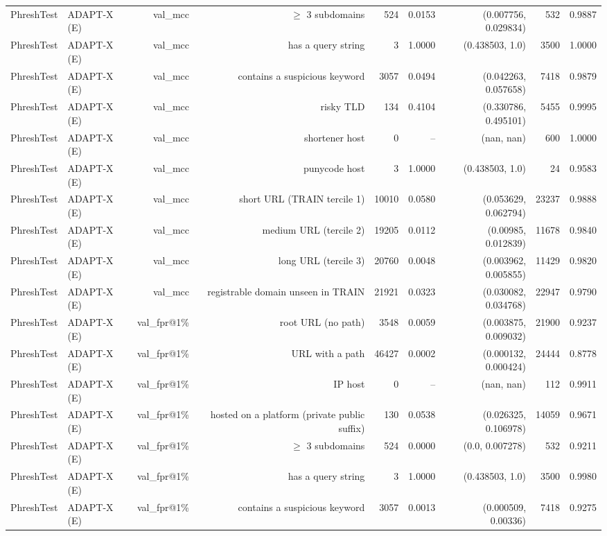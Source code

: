 \begin{table}[t]
\begin{tabular}{llrrrrrrr}
PhreshTest & ADAPT-X (E) & val\_mcc & $\geq$ 3 subdomains & 524 & 0.0153 & (0.007756, 0.029834) & 532 & 0.9887 \\
PhreshTest & ADAPT-X (E) & val\_mcc & has a query string & 3 & 1.0000 & (0.438503, 1.0) & 3500 & 1.0000 \\
PhreshTest & ADAPT-X (E) & val\_mcc & contains a suspicious keyword & 3057 & 0.0494 & (0.042263, 0.057658) & 7418 & 0.9879 \\
PhreshTest & ADAPT-X (E) & val\_mcc & risky TLD & 134 & 0.4104 & (0.330786, 0.495101) & 5455 & 0.9995 \\
PhreshTest & ADAPT-X (E) & val\_mcc & shortener host & 0 & -- & (nan, nan) & 600 & 1.0000 \\
PhreshTest & ADAPT-X (E) & val\_mcc & punycode host & 3 & 1.0000 & (0.438503, 1.0) & 24 & 0.9583 \\
PhreshTest & ADAPT-X (E) & val\_mcc & short URL (TRAIN tercile 1) & 10010 & 0.0580 & (0.053629, 0.062794) & 23237 & 0.9888 \\
PhreshTest & ADAPT-X (E) & val\_mcc & medium URL (tercile 2) & 19205 & 0.0112 & (0.00985, 0.012839) & 11678 & 0.9840 \\
PhreshTest & ADAPT-X (E) & val\_mcc & long URL (tercile 3) & 20760 & 0.0048 & (0.003962, 0.005855) & 11429 & 0.9820 \\
PhreshTest & ADAPT-X (E) & val\_mcc & registrable domain unseen in TRAIN & 21921 & 0.0323 & (0.030082, 0.034768) & 22947 & 0.9790 \\
PhreshTest & ADAPT-X (E) & val\_fpr@1\% & root URL (no path) & 3548 & 0.0059 & (0.003875, 0.009032) & 21900 & 0.9237 \\
PhreshTest & ADAPT-X (E) & val\_fpr@1\% & URL with a path & 46427 & 0.0002 & (0.000132, 0.000424) & 24444 & 0.8778 \\
PhreshTest & ADAPT-X (E) & val\_fpr@1\% & IP host & 0 & -- & (nan, nan) & 112 & 0.9911 \\
PhreshTest & ADAPT-X (E) & val\_fpr@1\% & hosted on a platform (private public suffix) & 130 & 0.0538 & (0.026325, 0.106978) & 14059 & 0.9671 \\
PhreshTest & ADAPT-X (E) & val\_fpr@1\% & $\geq$ 3 subdomains & 524 & 0.0000 & (0.0, 0.007278) & 532 & 0.9211 \\
PhreshTest & ADAPT-X (E) & val\_fpr@1\% & has a query string & 3 & 1.0000 & (0.438503, 1.0) & 3500 & 0.9980 \\
PhreshTest & ADAPT-X (E) & val\_fpr@1\% & contains a suspicious keyword & 3057 & 0.0013 & (0.000509, 0.00336) & 7418 & 0.9275 \\

\end{tabular}
\end{table}
